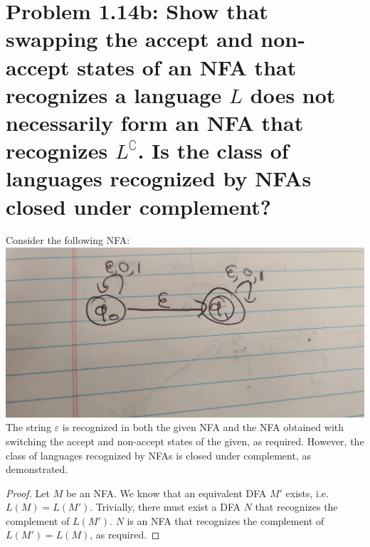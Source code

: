 \documentclass[12pt]{article}
\begin{document}
\section*{Problem 1.14b: Show that swapping the accept and non-accept states of an NFA that recognizes a language $L$ does not necessarily form an NFA that recognizes $L^{\complement}$. Is the class of languages recognized by NFAs closed under complement?}
Consider the following NFA: \\
\newline
\includegraphics[width=0.5\linewidth]{problem114b.jpg} \\
\newline
The string $\varepsilon$ is recognized in both the given NFA and the NFA obtained with switching the accept and non-accept states of the given, as required. However, the class of languages recognized by NFAs is closed under complement, as demonstrated. \\
\begin{proof}
	Let $M$ be an NFA. We know that an equivalent DFA $M'$ exists, i.e. $L(M) = L(M')$. Trivially, there must exist a DFA $N$ that recognizes the complement of $L(M')$. $N$ is an NFA that recognizes the complement of $L(M') = L(M)$, as required.
\end{proof}
\end{document}
